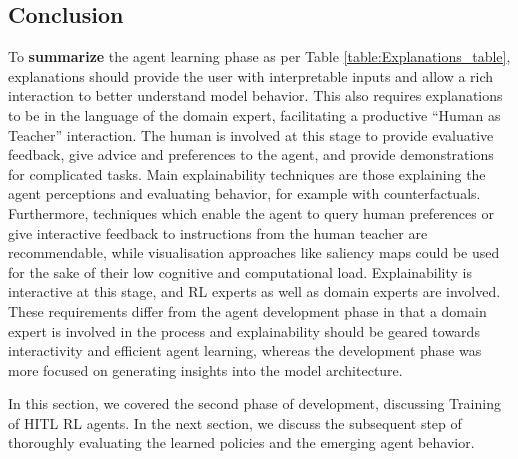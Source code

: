 \documentclass[twoside,11pt]{article}
\begin{document}
\begin{enumerate}
\subsection{Conclusion}


\noindent To \textbf{summarize} the agent learning phase as per Table \ref{table:Explanations_table}, explanations should provide the user with interpretable inputs and allow a rich interaction to better understand model behavior. This also requires explanations to be in the language of the domain expert, facilitating a productive ``Human as Teacher'' interaction. The human is involved at this stage to provide evaluative feedback, give advice and preferences to the agent, and provide demonstrations for complicated tasks. Main explainability techniques are those explaining the agent perceptions and evaluating behavior, for example with counterfactuals. Furthermore, techniques which enable the agent to query human preferences or give interactive feedback to instructions from the human teacher are recommendable, while visualisation approaches like saliency maps could be used for the sake of their low cognitive and computational load. Explainability is interactive at this stage, and RL experts as well as domain experts are involved. These requirements differ from the agent development phase in that a domain expert is involved in the process and explainability should be geared towards interactivity and efficient agent learning, whereas the development phase was more focused on generating insights into the model architecture.

In this section, we covered the second phase of development, discussing Training of HITL RL agents. In the next section, we discuss the subsequent step of thoroughly evaluating the learned policies and the emerging agent behavior. 


\end{enumerate}
\end{document}
